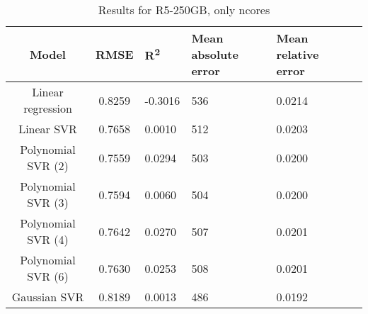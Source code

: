 \begin{table}[H]
\centering
\begin{adjustbox}{center}
\begin{tabular}{c | c M{1.2cm} M{2.5cm} M{2.5cm} M{1.8cm}}
Model & RMSE & R\textsuperscript{2} & Mean absolute error & Mean relative error \tabularnewline
\hline
Linear regression & 0.8259 & -0.3016 &    536 & 0.0214 \\
Linear SVR & 0.7658 & 0.0010 &    512 & 0.0203 \\
Polynomial SVR (2) & 0.7559 & 0.0294 &    503 & 0.0200 \\
Polynomial SVR (3) & 0.7594 & 0.0060 &    504 & 0.0200 \\
Polynomial SVR (4) & 0.7642 & 0.0270 &    507 & 0.0201 \\
Polynomial SVR (6) & 0.7630 & 0.0253 &    508 & 0.0201 \\
Gaussian SVR & 0.8189 & 0.0013 &    486 & 0.0192 \\
\end{tabular}
\end{adjustbox}
\\
\caption{Results for R5-250GB, only ncores}
\label{tab:only_1_linear_R5_250}
\end{table}
